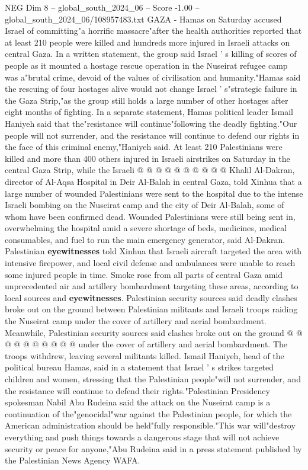 \begin{textsample}{NEG Dim 8 – global\_south\_2024\_06 – Score -1.00 – global\_south\_2024\_06/108957483.txt}  \label{ex:f8_neg_241}
GAZA - Hamas on Saturday accused Israel of committing"a horrific massacre"after the health authorities reported that at least 210 people were killed and hundreds more injured in Israeli attacks on central Gaza.
In a written statement, the group said Israel ' s killing of scores of people as it mounted a hostage rescue operation in the Nuseirat refugee camp was a"brutal crime, devoid of the values of civilisation and humanity."Hamas said the rescuing of four hostages alive would not change Israel ' s"strategic failure in the Gaza Strip,"as the group still holds a large number of other hostages after eight months of fighting.
In a separate statement, Hamas political leader Ismail Haniyeh said that the"resistance will continue"following the deadly fighting."Our people will not surrender, and the resistance will continue to defend our rights in the face of this criminal enemy,"Haniyeh said.
At least 210 Palestinians were killed and more than 400 others injured in Israeli airstrikes on Saturday in the central Gaza Strip, while the Israeli @ @ @ @ @ @ @ @ @ @ Khalil Al-Dakran, director of Al-Aqsa Hospital in Deir Al-Balah in central Gaza, told Xinhua that a large number of wounded Palestinians were sent to the hospital due to the intense Israeli bombing on the Nuseirat camp and the city of Deir Al-Balah, some of whom have been confirmed dead.
Wounded Palestinians were still being sent in, overwhelming the hospital amid a severe shortage of beds, medicines, medical consumables, and fuel to run the main emergency generator, said Al-Dakran.
Palestinian \textbf{eyewitnesses} told Xinhua that Israeli aircraft targeted the area with intensive firepower, and local civil defense and ambulances were unable to reach some injured people in time.
Smoke rose from all parts of central Gaza amid unprecedented air and artillery bombardment targeting these areas, according to local sources and \textbf{eyewitnesses}.
Palestinian security sources said deadly clashes broke out on the ground between Palestinian militants and Israeli troops raiding the Nuseirat camp under the cover of artillery and aerial bombardment.
Meanwhile, Palestinian security sources said clashes broke out on the ground @ @ @ @ @ @ @ @ @ @ under the cover of artillery and aerial bombardment.
The troops withdrew, leaving several militants killed.
Ismail Haniyeh, head of the political bureau Hamas, said in a statement that Israel ' s strikes targeted children and women, stressing that the Palestinian people"will not surrender, and the resistance will continue to defend their rights."Palestinian Presidency spokesman Nabil Abu Rudeina said the attack on the Nuseirat camp is a continuation of the"genocidal"war against the Palestinian people, for which the American administration should be held"fully responsible."This war will"destroy everything and push things towards a dangerous stage that will not achieve security or peace for anyone,"Abu Rudeina said in a press statement published by the Palestinian News Agency WAFA.

\end{textsample}

